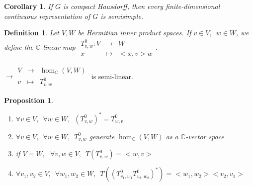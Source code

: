 \documentclass[12pt,letterpaper]{report}
\newtheorem{definition}{Definition}[section]
\newtheorem{proposition}{Proposition}[section]
\newtheorem{corollary}{Corollary}[section]
\begin{document}
\begin{corollary}If $G$ is compact Hausdorff, then every finite-dimensional continuous representation of $G$ is semisimple.\end{corollary}
\begin{definition}Let $V,W$ be Hermitian inner product spaces. If $v\in V,\,\,\,w\in W$, we define the $\mathbb{C}$-linear map $\begin{array}{rrr}T_{v,w}^{0}:V&\rightarrow&W\\x&\mapsto&<x,v>w\end{array}$.\end{definition}
$\rightarrow\begin{array}{rrr}V&\rightarrow&\hom_{\mathbb{C}}(V,W)\\v&\mapsto&T_{v,w}^{0}\end{array}$ is semi-linear.
\begin{proposition}\begin{enumerate}\item $\forall v\in V,\,\,\,\forall w\in W,\,\,\,(T_{v,w}^{0})^{*}=T_{w,v}^{0}$\item $\forall v\in V,\,\,\,\forall w\in W,\,\,\,T_{v,w}^{0}$ generate $\hom_{\mathbb{C}}(V,W)$ as a $\mathbb{C}$-vector space\item if $V=W,\,\,\,\,\forall v,w\in V,\,\,\,T(T_{v,w}^{0})=<w,v>$\item $\forall v_{1},v_{2}\in V,\,\,\,\forall w_{1},w_{2}\in W,\,\,\,T((T_{v_{1},w_{1}}^{0}T_{v_{2},w_{2}}^{0})^{*})=<w_{1},w_{2}><v_{2},v_{1}>$\end{enumerate}\end{proposition}
\end{document}
